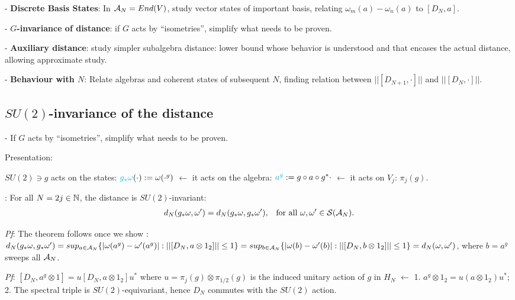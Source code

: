 - \textbf{Discrete Basis States}: In $\mathcal A_N = End(V)$, study vector states of important basis, relating $\omega_m(a) - \omega_n(a)$ to $[D_N, a]$.

- \textbf{$G$-invariance of distance}: if $G$ acts by ``isometries'', simplify what needs to be proven.

- \textbf{Auxiliary distance}: study simpler subalgebra distance: lower bound whose behavior is understood and that encases the actual distance, allowing approximate study.

- \textbf{Behaviour with $N$}: Relate algebras and coherent states of subsequent $N$, finding relation between $||[D_{N+1}, \cdot]||$ and $||[D_N, \cdot]||$.

\linea

\subsection{$SU(2)$-invariance of the distance}

 - If $G$ acts by ``isometries'', simplify what needs to be proven.

Presentation:

$SU(2) \ni g$ acts on the states: $\textcolor{cyan}{g_*\omega}(\cdot) := \omega(\cdot^g)$ $\longleftarrow$ it acts on the algebra: $\textcolor{cyan}{a^g}:= g\circ a \circ g^* \cdot$ $\longleftarrow$ it acts on $V_j$: $\pi_j(g)$.

\textbf{}: For all $N = 2j \in \mathbb{N}$, the distance is $SU(2)$-invariant: 
\begin{align}
    d_N(g_* \omega, \omega') &= d_N(g_* \omega, g_*\omega'), & \text{for all $\omega, \omega' \in \mathcal S(\mathcal A_N)$}.
\end{align}

\textit{Pf}: The theorem follows once we show 
    \rtext{$||[D_N, a^g]|| = ||[D_N, a]||$}:
$d_N(g_* \omega, g_* \omega') = sup_{a \in \mathcal A_N}\{ |\omega(a^g) - \omega'(a^g)|: ||[D_N, a \otimes 1_2]|| \leq 1 \} = sup_{b \in \mathcal A_N}\{ |\omega(b) - \omega'(b)|: ||[D_N, b \otimes 1_2]|| \leq 1 \} = d_N(\omega, \omega')$, where $b = a^g$ sweeps all $\mathcal A_N$.

\textit{Pf}: $[D_N, a^g \otimes 1] = u[D_N, a \otimes 1_2]u^*$ where $u = \pi_j(g) \otimes \pi_{1/2}(g)$ is the induced unitary action of $g$ in $H_N$ $\xleftarrow{}$
1. $a^g \otimes 1_2 = u(a \otimes 1_2)u^*$;
2. The spectral triple is $SU(2)$-equivariant, hence $D_N$ commutes with the $SU(2)$ action.

